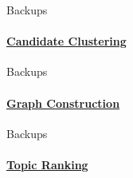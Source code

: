   \begin{frame}[label=candidate_clustering_backup]{Backups}
    \framesubtitle{\hyperlink{topicrank}{Candidate Clustering}}
  \end{frame}

  \begin{frame}[label=graph_construction_backup]{Backups}
    \framesubtitle{\hyperlink{topicrank}{Graph Construction}}
  \end{frame}

  \begin{frame}[label=topic_ranking_backup]{Backups}
    \framesubtitle{\hyperlink{topicrank}{Topic Ranking}}
  \end{frame}

